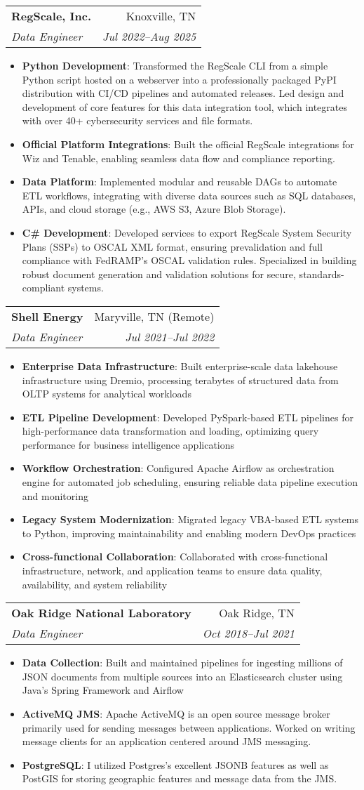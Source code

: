 \documentclass[letterpaper,11pt]{article}
\makeatletter
\newcommand{\resumeItem}[2]{
  \item\small{
    \textbf{#1}{: #2 \vspace{-2pt}}
  }
}
\newcommand{\resumeSubheading}[4]{
  \vspace{-1pt}\item
    \begin{tabular*}{0.97\textwidth}[t]{l@{\extracolsep{\fill}}r}
      \textbf{#1} & #2 \\
      \textit{\small#3} & \textit{\small #4} \\
    \end{tabular*}\vspace{-5pt}
}
\newcommand{\resumeItemListStart}{\begin{itemize}}
\newcommand{\resumeItemListEnd}{\end{itemize}\vspace{-5pt}}
\makeatother
\begin{document}
    \resumeSubheading
      {RegScale, Inc.}{Knoxville, TN}
      {Data Engineer}{Jul 2022--Aug 2025}
      \resumeItemListStart
      \resumeItem{Python Development}
      {Transformed the RegScale CLI from a simple Python script hosted on a webserver into a professionally packaged PyPI distribution with CI/CD pipelines and automated releases. Led design and development of core features for this data integration tool, which integrates with over 40+ cybersecurity services and file formats.}
      \resumeItem{Official Platform Integrations}
      {Built the official RegScale integrations for Wiz and Tenable, enabling seamless data flow and compliance reporting.}
      \resumeItem{Data Platform}
      {Implemented modular and reusable DAGs to automate ETL workflows, integrating with diverse data sources such as SQL databases, APIs, and cloud storage (e.g., AWS S3, Azure Blob Storage).}
      \resumeItem{C\# Development}
      {Developed services to export RegScale System Security Plans (SSPs) to OSCAL XML format, ensuring prevalidation and full compliance with FedRAMP's OSCAL validation rules. Specialized in building robust document generation and validation solutions for secure, standards-compliant systems.}
	\resumeItemListEnd
    \resumeSubheading
      {Shell Energy}{Maryville, TN (Remote)}
      {Data Engineer}{Jul 2021--Jul 2022}
      \resumeItemListStart
        \resumeItem{Enterprise Data Infrastructure}
          {Built enterprise-scale data lakehouse infrastructure using Dremio, processing terabytes of structured data from OLTP systems for analytical workloads}
        \resumeItem{ETL Pipeline Development}
          {Developed PySpark-based ETL pipelines for high-performance data transformation and loading, optimizing query performance for business intelligence applications}
        \resumeItem{Workflow Orchestration}
          {Configured Apache Airflow as orchestration engine for automated job scheduling, ensuring reliable data pipeline execution and monitoring}
        \resumeItem{Legacy System Modernization}
          {Migrated legacy VBA-based ETL systems to Python, improving maintainability and enabling modern DevOps practices}
        \resumeItem{Cross-functional Collaboration}
          {Collaborated with cross-functional infrastructure, network, and application teams to ensure data quality, availability, and system reliability}
      \resumeItemListEnd

    \resumeSubheading
      {Oak Ridge National Laboratory}{Oak Ridge, TN}
      {Data Engineer}{Oct 2018--Jul 2021}
      \resumeItemListStart
        \resumeItem{Data Collection}
          {Built and maintained pipelines for ingesting millions of JSON documents from multiple sources into an Elasticsearch cluster using Java's Spring Framework and Airflow}
        \resumeItem{ActiveMQ JMS}
          {Apache ActiveMQ is an open source message broker primarily used for sending messages between applications. Worked on writing message clients for an application centered around JMS messaging.}
        \resumeItem{PostgreSQL}
          {I utilized Postgres's excellent JSONB features as well as PostGIS for storing geographic features and message data from the JMS\@.}
      \resumeItemListEnd
\end{document}

